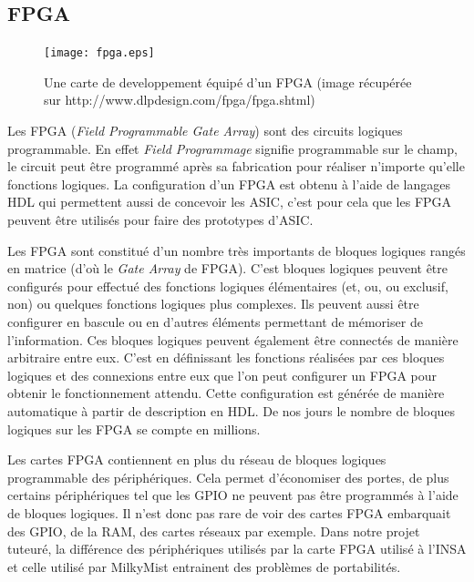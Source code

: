 \subsection{FPGA}

\begin{figure}[h!]
\begin{center}
\texttt{[image: fpga.eps]}
\end{center}
\caption{Une carte de developpement équipé d'un FPGA (image récupérée sur http://www.dlpdesign.com/fpga/fpga.shtml)}
\end{figure}

Les FPGA (\textit{Field Programmable Gate Array}) sont des circuits logiques
programmable. En effet \textit{Field Programmage} signifie programmable sur le champ,
le circuit peut être programmé après sa fabrication pour réaliser n'importe qu'elle
fonctions logiques. La configuration d'un FPGA est obtenu à l'aide de langages HDL
qui permettent aussi de concevoir les ASIC, c'est pour cela que les FPGA peuvent être
utilisés pour faire des prototypes d'ASIC.

Les FPGA sont constitué d'un nombre très importants de bloques logiques rangés en
matrice (d'où le \textit{Gate Array} de FPGA). C'est bloques logiques peuvent être
configurés pour effectué des fonctions logiques élémentaires (et, ou, ou exclusif,
non) ou quelques fonctions logiques plus complexes. Ils peuvent aussi être configurer
en bascule ou en d'autres éléments permettant de mémoriser de l'information. Ces
bloques logiques peuvent également être connectés de manière arbitraire entre eux.
C'est en définissant les fonctions réalisées par ces bloques logiques et des
connexions entre eux que l'on peut configurer un FPGA pour obtenir le fonctionnement
attendu. Cette configuration est générée de manière automatique à partir de
description en HDL. De nos jours le nombre de bloques logiques sur les FPGA se compte
en millions. 

Les cartes FPGA contiennent en plus du réseau de bloques logiques programmable des
périphériques. Cela permet d'économiser des portes, de plus certains périphériques
tel que les GPIO ne peuvent pas être programmés à l'aide de bloques logiques. Il
n'est donc pas rare de voir des cartes FPGA embarquait des GPIO, de la RAM, des
cartes réseaux par exemple. Dans notre projet tuteuré, la différence des
périphériques utilisés par la carte FPGA utilisé à l'INSA et celle utilisé par
MilkyMist entrainent des problèmes de portabilités.

